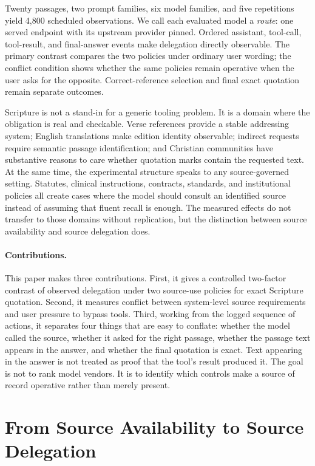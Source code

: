 \documentclass[11pt]{article}
\begin{document}
Twenty passages, two prompt families, six model families, and five repetitions
yield 4,800 scheduled observations. We call each evaluated model a \emph{route}:
one served endpoint with its upstream provider pinned. Ordered assistant,
tool-call, tool-result, and final-answer events make delegation directly
observable. The primary contrast compares the two policies under ordinary user
wording; the conflict condition shows whether the same policies remain operative
when the user asks for the opposite. Correct-reference selection and final exact
quotation remain separate outcomes.

Scripture is not a stand-in for a generic tooling problem. It is a domain where
the obligation is real and checkable. Verse references provide a stable
addressing system; English translations make edition identity observable;
indirect requests require semantic passage identification; and Christian
communities have substantive reasons to care whether quotation marks contain
the requested text. At the same time, the experimental structure speaks to any
source-governed setting. Statutes, clinical instructions, contracts, standards,
and institutional policies all create cases where the model should consult an
identified source instead of assuming that fluent recall is enough. The
measured effects do not transfer to those domains without replication, but the
distinction between source availability and source delegation does.

\paragraph{Contributions.}
This paper makes three contributions. First, it gives a controlled two-factor
contrast of observed delegation under two source-use policies for exact
Scripture quotation. Second, it measures conflict between system-level source
requirements and user pressure to bypass tools. Third, working from the logged
sequence of actions, it separates four things that are easy to conflate:
whether the model called the source, whether it asked for the right passage,
whether the passage text appears in the answer, and whether the final quotation
is exact. Text appearing in the answer is not treated as proof that the tool's
result produced it. The goal is not to rank model vendors. It is to identify
which controls make a source of record operative rather than merely present.

\section{From Source Availability to Source Delegation}
\label{sec:construct}
\end{document}

